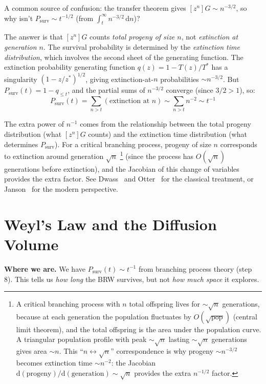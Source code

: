 \documentclass[11pt,a4paper]{article}
\theoremstyle{definition}
\newcommand{\dd}{\mathrm{d}}
\newcommand{\Psurv}{P_{\mathrm{surv}}}
\begin{document}
A common source of confusion: the transfer theorem gives $[z^n]G \sim n^{-3/2}$,
so why isn't $\Psurv \sim t^{-1/2}$ (from $\int_t^\infty n^{-3/2}\, \dd n$)?

The answer is that $[z^n]G$ counts \emph{total progeny of size $n$}, not
\emph{extinction at generation $n$}. The survival probability is determined by
the \emph{extinction time distribution}, which involves the second sheet of
the generating function. The extinction probability generating function
$q(z) = 1 - T(z)/T^*$ has a singularity $(1 - z/z^*)^{1/2}$, giving
extinction-at-$n$ probabilities $\sim n^{-3/2}$. But $\Psurv(t) = 1 - q_{\leq t}$,
and the partial sums of $n^{-3/2}$ converge (since $3/2 > 1$), so:
\[
\Psurv(t) = \sum_{n>t} (\text{extinction at } n)
\sim \sum_{n>t} n^{-2} \sim t^{-1}
\]

The extra power of $n^{-1}$ comes from the relationship between the total
progeny distribution (what $[z^n]G$ counts) and the extinction time
distribution (what determines $\Psurv$). For a critical branching process,
progeny of size $n$ corresponds to extinction around generation $\sqrt{n}$%
\footnote{A critical branching process with $n$ total offspring lives for
$\sim\!\sqrt{n}$ generations, because at each generation the population
fluctuates by $O(\sqrt{\text{pop}})$ (central limit theorem), and the
total offspring is the area under the population curve. A triangular
population profile with peak $\sim\!\sqrt{n}$ lasting $\sim\!\sqrt{n}$
generations gives area $\sim n$. This ``$n \leftrightarrow \sqrt{n}$''
correspondence is why progeny $\sim n^{-3/2}$ becomes extinction time
$\sim n^{-2}$: the Jacobian $\dd(\text{progeny})/\dd(\text{generation})
\sim \sqrt{n}$ provides the extra $n^{-1/2}$ factor.}
(since the process has $O(\sqrt{n})$ generations before extinction),
and the Jacobian of this change of variables provides the extra factor.
See Dwass~\cite{dwass1969} and Otter~\cite{otter1949} for the classical
treatment, or Janson~\cite{janson2012} for the modern perspective.

\section{Weyl's Law and the Diffusion Volume}
\label{sec:weyl}

\noindent\textbf{Where we are.} We have $\Psurv(t) \sim t^{-1}$ from
branching process theory (step 8). This tells us \emph{how long}
the BRW survives, but not \emph{how much space} it explores.
\end{document}
